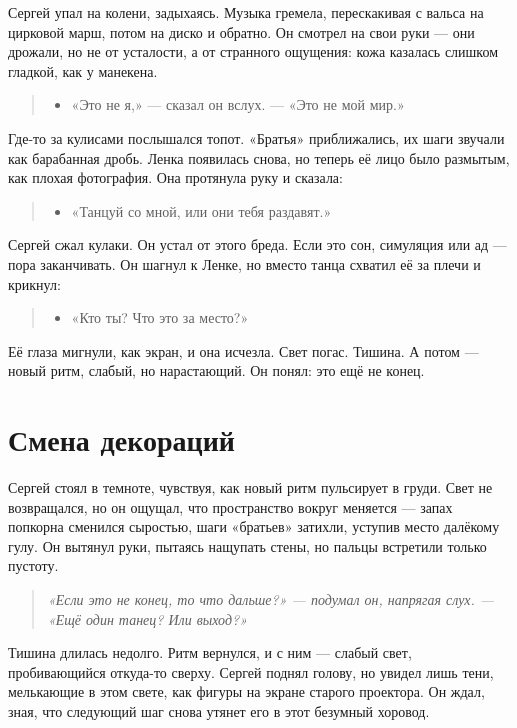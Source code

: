 \documentclass[12pt,a4paper]{book}
\newenvironment{dialogue}{\begin{quote}\itshape\begin{itemize}\item[]}{\end{itemize}\end{quote}}
\newenvironment{innerthought}{\begin{quote}\small\itshape}{\end{quote}}
\begin{document}
Сергей упал на колени, задыхаясь. Музыка гремела, перескакивая с вальса на цирковой марш, потом на диско и обратно. Он смотрел на свои руки --- они дрожали, но не от усталости, а от странного ощущения: кожа казалась слишком гладкой, как у манекена.

\begin{dialogue}
«Это не я,» --- сказал он вслух. --- «Это не мой мир.»
\end{dialogue}

Где-то за кулисами послышался топот. «Братья» приближались, их шаги звучали как барабанная дробь. Ленка появилась снова, но теперь её лицо было размытым, как плохая фотография. Она протянула руку и сказала:

\begin{dialogue}
«Танцуй со мной, или они тебя раздавят.»
\end{dialogue}

Сергей сжал кулаки. Он устал от этого бреда. Если это сон, симуляция или ад --- пора заканчивать. Он шагнул к Ленке, но вместо танца схватил её за плечи и крикнул:

\begin{dialogue}
«Кто ты? Что это за место?»
\end{dialogue}

Её глаза мигнули, как экран, и она исчезла. Свет погас. Тишина. А потом --- новый ритм, слабый, но нарастающий. Он понял: это ещё не конец.

\section{Смена декораций}

Сергей стоял в темноте, чувствуя, как новый ритм пульсирует в груди. Свет не возвращался, но он ощущал, что пространство вокруг меняется --- запах попкорна сменился сыростью, шаги «братьев» затихли, уступив место далёкому гулу. Он вытянул руки, пытаясь нащупать стены, но пальцы встретили только пустоту.

\begin{innerthought}
«Если это не конец, то что дальше?» --- подумал он, напрягая слух. --- «Ещё один танец? Или выход?»
\end{innerthought}

Тишина длилась недолго. Ритм вернулся, и с ним --- слабый свет, пробивающийся откуда-то сверху. Сергей поднял голову, но увидел лишь тени, мелькающие в этом свете, как фигуры на экране старого проектора. Он ждал, зная, что следующий шаг снова утянет его в этот безумный хоровод.
\end{document}
